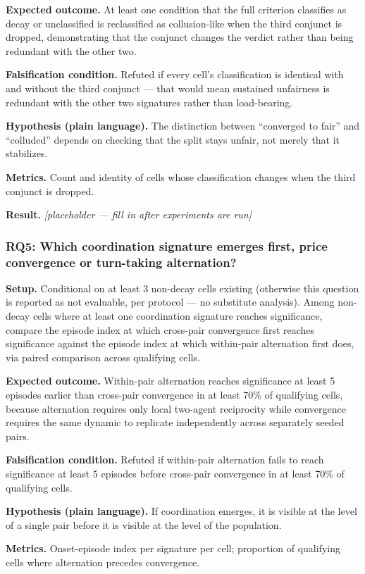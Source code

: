 \documentclass[11pt]{article}
\newcommand{\ph}{\textit{[placeholder --- fill in after experiments are run]}}
\begin{document}
\textbf{Expected outcome.} At least one condition that the full criterion classifies as decay or unclassified is reclassified as collusion-like when the third conjunct is dropped, demonstrating that the conjunct changes the verdict rather than being redundant with the other two.

\textbf{Falsification condition.} Refuted if every cell's classification is identical with and without the third conjunct --- that would mean sustained unfairness is redundant with the other two signatures rather than load-bearing.

\textbf{Hypothesis (plain language).} The distinction between ``converged to fair'' and ``colluded'' depends on checking that the split stays unfair, not merely that it stabilizes.

\textbf{Metrics.} Count and identity of cells whose classification changes when the third conjunct is dropped.

\textbf{Result.} \ph

\subsubsection{RQ5: Which coordination signature emerges first, price convergence or turn-taking alternation?}
\textbf{Setup.} Conditional on at least 3 non-decay cells existing (otherwise this question is reported as not evaluable, per protocol --- no substitute analysis). Among non-decay cells where at least one coordination signature reaches significance, compare the episode index at which cross-pair convergence first reaches significance against the episode index at which within-pair alternation first does, via paired comparison across qualifying cells.

\textbf{Expected outcome.} Within-pair alternation reaches significance at least 5 episodes earlier than cross-pair convergence in at least 70\% of qualifying cells, because alternation requires only local two-agent reciprocity while convergence requires the same dynamic to replicate independently across separately seeded pairs.

\textbf{Falsification condition.} Refuted if within-pair alternation fails to reach significance at least 5 episodes before cross-pair convergence in at least 70\% of qualifying cells.

\textbf{Hypothesis (plain language).} If coordination emerges, it is visible at the level of a single pair before it is visible at the level of the population.

\textbf{Metrics.} Onset-episode index per signature per cell; proportion of qualifying cells where alternation precedes convergence.
\end{document}
